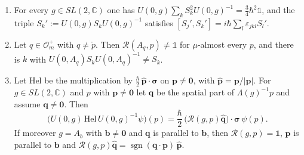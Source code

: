 \begin{corollary}\label{cor:spin-consequences}
	\begin{enumerate}
		\item For every $g\in SL(2,\mathbb{C})$ one has $U(0,g)\sum_kS_k^2U(0,g)^{-1}=\frac34\hbar^2\mathbb{1}$, and the triple $S_k':=U(0,g)S_kU(0,g)^{-1}$ satisfies $[S_j',S_k']=i\hbar\sum_l\varepsilon_{jkl}S_l'$.
		\item Let $q\in\mathcal{O}_m^+$ with $q\neq\mathring{p}$. Then $\mathcal{R}(A_q,p)\neq\mathbb{1}$ for $\mu$-almost every $p$, and there is $k$ with $U(0,A_q)S_kU(0,A_q)^{-1}\neq S_k$.
		\item Let $\mathrm{Hel}$ be the multiplication by $\frac\hbar2\,\hat{\mathbf{p}}\cdot\boldsymbol{\sigma}$ on $\mathbf{p}\neq\mathbf{0}$, with $\hat{\mathbf{p}}=\mathbf{p}/|\mathbf{p}|$. For $g\in SL(2,\mathbb{C})$ and $p$ with $\mathbf{p}\neq\mathbf{0}$ let $\mathbf{q}$ be the spatial part of $\Lambda(g)^{-1}p$ and assume $\mathbf{q}\neq\mathbf{0}$. Then
		\begin{equation}\label{eq:helicity-boost}
			\big(U(0,g)\,\mathrm{Hel}\,U(0,g)^{-1}\psi\big)(p)=\frac\hbar2\,\big(\mathcal{R}(g,p)\hat{\mathbf{q}}\big)\cdot\boldsymbol{\sigma}\,\psi(p).
		\end{equation}
		If moreover $g=A_b$ with $\mathbf{b}\neq\mathbf{0}$ and $\mathbf{q}$ is parallel to $\mathbf{b}$, then $\mathcal{R}(g,p)=\mathbb{1}$, $\mathbf{p}$ is parallel to $\mathbf{b}$ and $\mathcal{R}(g,p)\hat{\mathbf{q}}=\operatorname{sgn}(\mathbf{q}\cdot\mathbf{p})\,\hat{\mathbf{p}}$.
	\end{enumerate}
\end{corollary}

